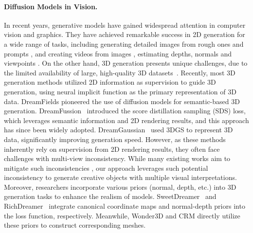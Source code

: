 \paragraph{Diffusion Models in Vision.} In recent years, generative models have gained widespread attention in computer vision and graphics. They have achieved remarkable success in 2D generation for a wide range of tasks, including generating detailed images from rough ones \cite{SUPIR,yang2023pasd,lin2024diffbir,wang2024exploiting} and prompts \cite{DALLE,LatentDiffusion,Photorealistic}, and creating videos from images \cite{sun2024dimensionx,yu2024viewcrafter}, estimating depths, normals \cite{depth_anything_v1, depth_anything_v2, ye2024stablenormal,he2024lotus} and viewpoints \cite{dust3r,pd}.
On the other hand, 3D generation presents unique challenges, due to the limited availability of large, high-quality 3D datasets~\cite{ABC,wu2023omniobject3d,objaverse,objaverseXL}. Recently, most 3D generation methods \cite{jain2021dreamfields,poole2022dreamfusion,wang2023prolificdreamer,lin2023magic3d,chen2023fantasia3d,MAkeit3D} utilized 2D information as supervision to guide 3D generation, using neural implicit function as the primary representation of 3D data. DreamFields \cite{jain2021dreamfields} pioneered the use of diffusion models for semantic-based 3D generation. DreamFussion~\cite{poole2022dreamfusion} introduced the score distillation sampling (SDS) loss, which leverages semantic information and 2D rendering results, and this approach has since been widely adopted. DreamGaussian~\cite{tang2023dreamgaussian} used 3DGS to represent 3D data, significantly improving generation speed. However, as these methods inherently rely on supervision from 2D rendering results, they often face challenges with multi-view inconsistency. While many existing works aim to mitigate such inconsistencies \cite{liu2023zero1to3,shi2023MVDream}, our approach leverages such potential inconsistency to generate creative objects with multiple visual interpretations. Moreover, researchers incorporate various priors (normal, depth, etc.) into 3D generation tasks to enhance the realism of models. SweetDreamer~\cite{sweetdreamer} and RichDreamer \cite{qiu2024richdreamer}~integrate canonical coordinate maps and normal-depth priors into the loss function, respectively. Meanwhile, Wonder3D \cite{long2023wonder3d} and CRM \cite{wang2024crm} directly utilize these priors to construct corresponding meshes.